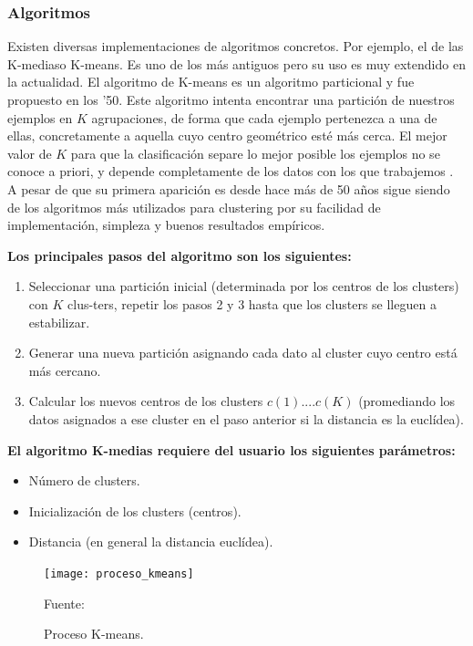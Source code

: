 \subsubsection{Algoritmos}

Existen diversas implementaciones de algoritmos concretos. Por ejemplo, el de las K-mediaso K-means. Es uno de los más antiguos pero su uso es muy extendido en la actualidad.
\vskip 1cm
El algoritmo de K-means es un algoritmo particional y fue propuesto en los ’50. Este algoritmo intenta encontrar una partición de nuestros ejemplos en \(K\) agrupaciones, de forma que cada ejemplo pertenezca a una de ellas, concretamente a aquella cuyo centro geométrico esté más cerca. El mejor valor de \(K\) para que la clasificación separe lo mejor posible los ejemplos no se conoce a priori, y depende completamente de los datos con los que trabajemos \citep{Jain}.
\vskip 1cm 
A pesar de que su primera aparición es desde hace más de 50 años sigue siendo de los algoritmos más utilizados para clustering por su facilidad de implementación, simpleza y buenos resultados empíricos.
\vskip 1cm 

\textbf{Los principales pasos del algoritmo son los siguientes:}

\begin{enumerate}
	\item Seleccionar una partición inicial (determinada por los centros de los clusters) con \(K\) clus-ters, repetir los pasos 2 y 3 hasta que los clusters se lleguen a estabilizar.
	\item Generar una nueva partición asignando cada dato al cluster cuyo centro está más cercano.	
	\item Calcular los nuevos centros de los clusters \(c(1)....c(K)\) (promediando los datos asignados a ese cluster en el paso anterior si la distancia es la euclídea).
\end{enumerate}

\textbf{El algoritmo K-medias requiere del usuario los siguientes parámetros:}

\begin{itemize}
	\item Número de clusters.
	\item Inicialización de los clusters (centros).
	\item Distancia (en general la distancia euclídea).
\end{itemize}

\begin{figure}[ht]
	\begin{center}
		\texttt{[image: proceso\_kmeans]}
	\end{center}
	\begin{center}
		\vskip -0.5cm
		\caption{\small{Proceso K-means.}}
		{\small{Fuente: }}
	\end{center}
\end{figure}


